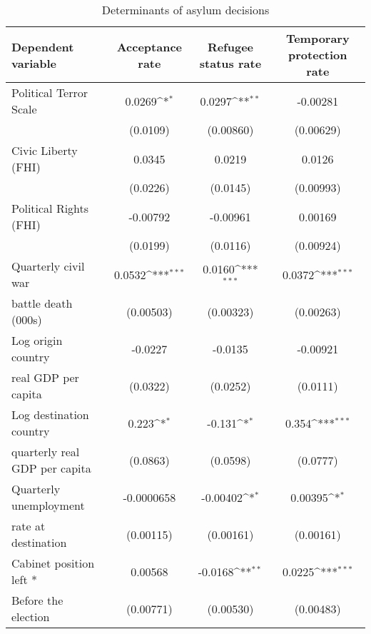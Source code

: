 \begin{table}[!ht]\centering \scriptsize
\def\sym#1{\ifmmode^{#1}\else\(^{#1}\)\fi}
\caption{Determinants of asylum decisions}
\begin{tabular}{l*{3}{c}}
\hline\hline
Dependent variable                    &\multicolumn{1}{c}{Acceptance rate}&\multicolumn{1}{c}{Refugee status rate}&\multicolumn{1}{c}{Temporary protection rate}\\
\hline
Political Terror Scale&      0.0269\sym{*}  &      0.0297\sym{**} &    -0.00281         \\
                    &    (0.0109)         &   (0.00860)         &   (0.00629)         \\
[0.5em]
Civic Liberty (FHI) &      0.0345         &      0.0219         &      0.0126         \\
                    &    (0.0226)         &    (0.0145)         &   (0.00993)         \\
[0.5em]
Political Rights (FHI)&    -0.00792         &    -0.00961         &     0.00169         \\
                    &    (0.0199)         &    (0.0116)         &   (0.00924)         \\
[0.5em]
Quarterly civil war &      0.0532\sym{***}&      0.0160\sym{***}&      0.0372\sym{***}\\
battle death (000s)                    &   (0.00503)         &   (0.00323)         &   (0.00263)         \\
[0.5em]
Log origin country &     -0.0227         &     -0.0135         &    -0.00921         \\
real GDP per capita                    &    (0.0322)         &    (0.0252)         &    (0.0111)         \\
[0.5em]
Log destination country&       0.223\sym{*}  &      -0.131\sym{*}  &       0.354\sym{***}\\
 quarterly real GDP per capita                    &    (0.0863)         &    (0.0598)         &    (0.0777)         \\
[0.5em]
Quarterly unemployment &  -0.0000658         &    -0.00402\sym{*}  &     0.00395\sym{*}  \\
rate at destination                    &   (0.00115)         &   (0.00161)         &   (0.00161)         \\
[0.5em]
Cabinet position left * &     0.00568         &     -0.0168\sym{**} &      0.0225\sym{***}\\
 Before the election                   &   (0.00771)         &   (0.00530)         &   (0.00483)         \\

\end{tabular}
\end{table}
